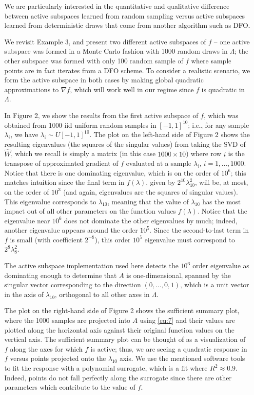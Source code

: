\documentclass{amsart}
\begin{document}
We are particularly interested in the quantitative and qualitative difference between active subspaces learned from random sampling versus active subspaces learned from deterministic draws that come from another algorithm such as DFO.


We revisit Example 3, and present two different active subspaces of $f$ -- one active subspace was formed in a Monte Carlo fashion with 1000 random draws in $\Lambda$; the other subspace was formed with only 100 random sample of $f$ where sample points are in fact iterates from a DFO scheme. To consider a realistic scenario, we form the active subspace in both cases by making global quadratic approximations to $\nabla f$, which will work well in our regime since $f$ is quadratic in $\Lambda$.

In Figure 2, we show the results from the first active subspace of $f$, which was obtained from 1000 iid uniform random samples in $[-1,1]^{10}$; i.e., for any sample $\lambda_i$, we have $\lambda_i \sim U[-1,1]^{10}$. The plot on the left-hand side of Figure 2 shows the resulting eigenvalues (the squares of the singular values) from taking the SVD of $\hat{W}$, which we recall is simply a matrix (in this case $1000 \times 10$) where row $i$ is the transpose of approximated gradient of $f$ evaluated at a sample $\lambda_i$, $i=1,\ldots,1000$. Notice that there is one dominating eigenvalue, which is on the order of $10^6$; this matches intuition since the final term in $f(\lambda)$, given by $2^{10}\lambda_{10}^2$, will be, at most, on the order of $10^3$ (and again, eigenvalues are the squares of singular values). This eigenvalue corresponds to $\lambda_{10}$, meaning that the value of $\lambda_{10}$ has the most impact out of all other parameters on the function values $f(\lambda)$. Notice that the eigenvalue near $10^6$ does not dominate the other eigenvalues by much; indeed, another eigenvalue appears around the order $10^5$. Since the second-to-last term in $f$ is small (with coefficient $2^{-9}$), this order $10^5$ eigenvalue must correspond to $2^8\lambda_8^2$.

The active subspace implementation used here \cite{Constantine2015} detects the $10^6$ order eigenvalue as dominating enough to determine that $A$ is one-dimensional, spanned by the singular vector corresponding to the direction $(0,\ldots,0,1)$, which is a unit vector in the axis of $\lambda_{10}$, orthogonal to all other axes in $\Lambda$.

The plot on the right-hand side of Figure 2 shows the sufficient summary plot, where the 1000 samples are projected into $A$ using \eqref{eq:7} and their values are plotted along the horizontal axis against their original function values on the vertical axis. The sufficient summary plot can be thought of as a visualization of $f$ along the axes for which $f$ is active; thus, we are seeing a quadratic response in $f$ versus points projected onto the $\lambda_{10}$ axis. We use the mentioned software tools to fit the response with a polynomial surrogate, which is a fit where $R^2\approx 0.9$. Indeed, points do not fall perfectly along the surrogate since there are other parameters which contribute to the value of $f$.
\end{document}
